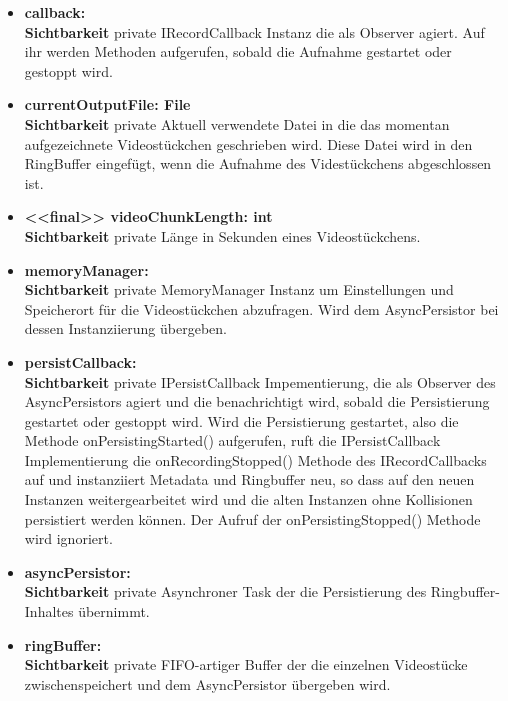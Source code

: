 \begin{itemize}
\item \textbf{callback: } \hfill\\ 
\textbf{Sichtbarkeit} private \newline
IRecordCallback Instanz die als Observer agiert. Auf ihr werden Methoden aufgerufen, sobald die Aufnahme gestartet oder gestoppt wird.

\item \textbf{currentOutputFile: File} \hfill\\ 
\textbf{Sichtbarkeit} private \newline
Aktuell verwendete Datei in die das momentan aufgezeichnete Videostückchen geschrieben wird. Diese Datei wird in den RingBuffer eingefügt, wenn die Aufnahme des Videstückchens abgeschlossen ist.

\item \textbf{<<final>> videoChunkLength: int} \hfill\\ 
\textbf{Sichtbarkeit} private \newline
Länge in Sekunden eines Videostückchens.

\item \textbf{memoryManager: } \hfill\\ 
\textbf{Sichtbarkeit} private \newline
MemoryManager Instanz um Einstellungen und Speicherort für die Videostückchen abzufragen. Wird dem AsyncPersistor bei dessen Instanziierung übergeben.

\item \textbf{persistCallback: } \hfill\\ 
\textbf{Sichtbarkeit} private \newline
IPersistCallback Impementierung, die als Observer des AsyncPersistors agiert und die benachrichtigt wird, sobald die Persistierung gestartet oder gestoppt wird. Wird die Persistierung gestartet, also die Methode onPersistingStarted() aufgerufen, ruft die IPersistCallback Implementierung die onRecordingStopped() Methode des IRecordCallbacks auf und instanziiert Metadata und Ringbuffer neu, so dass auf den neuen Instanzen weitergearbeitet wird und die alten Instanzen ohne Kollisionen persistiert werden können. Der Aufruf der onPersistingStopped() Methode wird ignoriert.

\item \textbf{asyncPersistor: } \hfill\\ 
\textbf{Sichtbarkeit} private \newline
Asynchroner Task der die Persistierung des Ringbuffer-Inhaltes übernimmt.

\item \textbf{ringBuffer: } \hfill\\ 
\textbf{Sichtbarkeit} private \newline
FIFO-artiger Buffer der die einzelnen Videostücke zwischenspeichert und dem AsyncPersistor übergeben wird.

\end{itemize}


